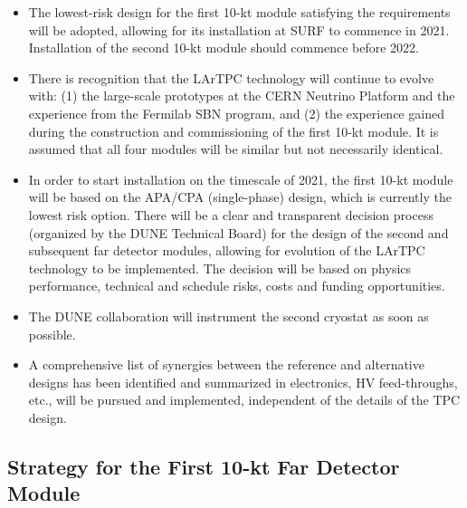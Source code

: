 \begin{itemize}
\item The lowest-risk design for the first 10-kt module satisfying the requirements 
will be adopted, allowing for its installation at SURF to commence in 2021. %
Installation  of the second 10-kt module should commence before 2022. %

\item  There is recognition that the LArTPC technology will continue to evolve with: (1) the 
large-scale prototypes at the CERN Neutrino Platform and the experience from the 
Fermilab SBN program, and (2) the experience gained during the construction and 
commissioning of the first 10-kt module. It is assumed that all four modules 
will be similar but not necessarily identical.

\item  In order to start installation on the timescale of 2021, %
the first  10-kt module will be based on the APA/CPA (single-phase) design, which is currently the lowest
risk option. There will be a clear and transparent decision process (organized by the DUNE 
Technical Board) for the design 
of the second and subsequent far detector modules, allowing for evolution of the 
LArTPC technology to be implemented. The decision will be 
based on physics performance, technical and schedule risks, costs and funding 
opportunities.

\item The DUNE collaboration will instrument the second cryostat as soon as possible.

\item A comprehensive list of synergies between the reference and alternative designs 
has been identified and summarized in %
electronics, HV feed-throughs, etc., will be pursued and implemented, independent 
of the details of the TPC design.

\end{itemize}
\subsection{Strategy for the First 10-kt Far Detector Module}
\label{v1ch3:first-fd-mod-strategy}

